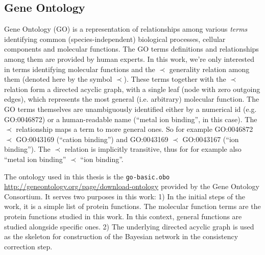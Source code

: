 \documentclass[11pt,twoside,a4paper]{book}
\begin{document}
\subsection{Gene Ontology}
Gene Ontology (GO) \cite{go} is a representation of relationships among various \emph{terms} identifying common (species-independent)
biological processes, cellular components and molecular functions.
The GO terms definitions and relationships among them are provided by human experts. 
In this work, we're only interested in terms identifying molecular functions and the $\prec$ generality relation among them
(denoted here by the symbol $\prec$).
These terms together with the $\prec$ relation form a directed acyclic graph, with a single leaf (node with zero outgoing edges),
which represents the
most general (i.e. arbitrary) molecular function. 
The GO terms themselves are unambiguously identified either by a numerical id (e.g. GO:0046872) or a human-readable name
(``metal ion binding'', in this case).
The $\prec$ relationship maps a term to more general ones. So for example GO:0046872 $\prec$ GO:0043169 (``cation binding'')
 and GO:0043169  $\prec$ GO:0043167 (``ion binding'').
 The $\prec$ relation is implicitly transitive,
 thus for for example also ``metal ion binding''  $\prec$ ``ion binding''.
 
The ontology used in this thesis is the \texttt{go-basic.obo} \cite{gores} \url{http://geneontology.org/page/download-ontology} provided by the Gene Ontology Consortium. 
It serves two purposes in this work:
1) In the initial steps of the work, it is a simple list of protein functions.
The molecular function terms are the protein functions studied in this work.
In this context, general functions are studied alongside specific ones. 
2) The underlying directed acyclic graph is used as the skeleton for construction of the 
Bayesian network in the consistency correction step. 
\end{document}
